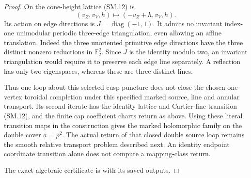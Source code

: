\begin{proof}
On the cone-height lattice (SM.12) is
\[
             (v_Z,v_V,h)\longmapsto(-v_Z+h,v_V,h).
 \tag{SM.13}
\]
Its action on edge directions is
\(J=\operatorname{diag}(-1,1)\). It admits no invariant
index-one unimodular periodic three-edge triangulation,
even allowing an affine translation. Indeed the three
unoriented primitive edge directions have the three
distinct nonzero reductions in \(\mathbb F_2^2\).
Since \(J\) is the identity modulo two, an invariant
triangulation would require it to preserve each edge
line separately. A reflection has only two eigenspaces,
whereas these are three distinct lines.

Thus one loop about this selected-cusp puncture does not
close the chosen one-vertex toroidal completion under this
specified marked source, line and annular transport. Its
second iterate has the identity lattice and Cartier-line
transition (SM.12), and the finite cap coefficient
charts return as above. Using these literal transition maps
in the construction gives the marked holomorphic family
on the double cover \(a=\rho^2\). The actual return of that
closed double source loop remains the smooth relative
transport problem described next. An identity endpoint
coordinate transition alone does not compute a
mapping-class return.

The exact algebraic certificate is  with its saved outputs.
\end{proof}
